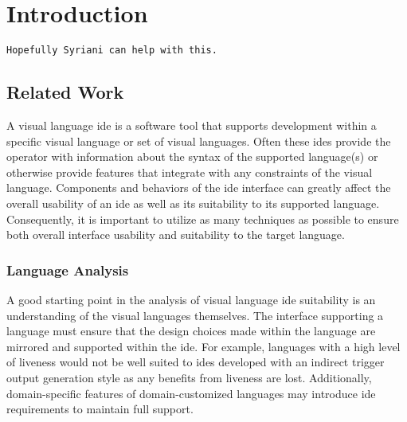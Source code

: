 \section{Introduction}
\label{sec:introduction}

\begin{verbatim}
Hopefully Syriani can help with this.
\end{verbatim}

\subsection{Related Work}
\label{subsec:related_work}

A visual language \ac{ide} is a software tool that supports
development within a specific visual language or set of visual languages.
Often these \acp{ide} provide the operator with information about the
syntax of the supported language(s) or otherwise provide features that
integrate with any constraints of the visual language. Components and
behaviors of the \ac{ide} interface can greatly affect the overall
usability of an \ac{ide} as well as its suitability to its supported
language. Consequently, it is important to utilize as many techniques as
possible to ensure both overall interface usability and suitability to the
target language.

\subsubsection{Language Analysis}
A good starting point in the analysis of visual language \ac{ide}
suitability is an understanding of the visual languages themselves. The
interface supporting a language must ensure that the design choices made
within the language are mirrored and supported within the \ac{ide}.
\cite{hils1992} For example, languages with a high level of liveness
\cite{hils1992} would not be well suited to \acp{ide} developed with an
indirect trigger output generation style as any benefits from liveness are
lost. Additionally, domain-specific features of domain-customized languages
may introduce \ac{ide} requirements to maintain full support.
